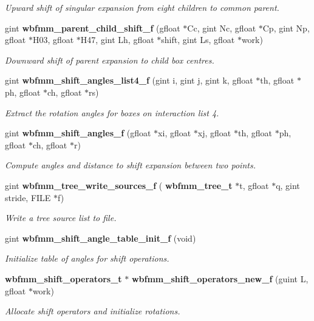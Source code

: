 \begin{DoxyCompactItemize}
\begin{DoxyCompactList}\small\item\em Upward shift of singular expansion from eight children to common parent. \end{DoxyCompactList}\item 
gint \textbf{ wbfmm\+\_\+parent\+\_\+child\+\_\+shift\+\_\+f} (gfloat $\ast$Cc, gint Nc, gfloat $\ast$Cp, gint Np, gfloat $\ast$H03, gfloat $\ast$H47, gint Lh, gfloat $\ast$shift, gint Ls, gfloat $\ast$work)
\begin{DoxyCompactList}\small\item\em Downward shift of parent expansion to child box centres. \end{DoxyCompactList}\item 
gint \textbf{ wbfmm\+\_\+shift\+\_\+angles\+\_\+list4\+\_\+f} (gint i, gint j, gint k, gfloat $\ast$th, gfloat $\ast$ph, gfloat $\ast$ch, gfloat $\ast$rs)
\begin{DoxyCompactList}\small\item\em Extract the rotation angles for boxes on interaction list 4. \end{DoxyCompactList}\item 
gint \textbf{ wbfmm\+\_\+shift\+\_\+angles\+\_\+f} (gfloat $\ast$xi, gfloat $\ast$xj, gfloat $\ast$th, gfloat $\ast$ph, gfloat $\ast$ch, gfloat $\ast$r)
\begin{DoxyCompactList}\small\item\em Compute angles and distance to shift expansion between two points. \end{DoxyCompactList}\item 
gint \textbf{ wbfmm\+\_\+tree\+\_\+write\+\_\+sources\+\_\+f} (\textbf{ wbfmm\+\_\+tree\+\_\+t} $\ast$t, gfloat $\ast$q, gint stride, F\+I\+LE $\ast$f)
\begin{DoxyCompactList}\small\item\em Write a tree source list to file. \end{DoxyCompactList}\item 
gint \textbf{ wbfmm\+\_\+shift\+\_\+angle\+\_\+table\+\_\+init\+\_\+f} (void)
\begin{DoxyCompactList}\small\item\em Initialize table of angles for shift operations. \end{DoxyCompactList}\item 
\textbf{ wbfmm\+\_\+shift\+\_\+operators\+\_\+t} $\ast$ \textbf{ wbfmm\+\_\+shift\+\_\+operators\+\_\+new\+\_\+f} (guint L, gfloat $\ast$work)
\begin{DoxyCompactList}\small\item\em Allocate shift operators and initialize rotations. \end{DoxyCompactList}\item 

\end{DoxyCompactItemize}
